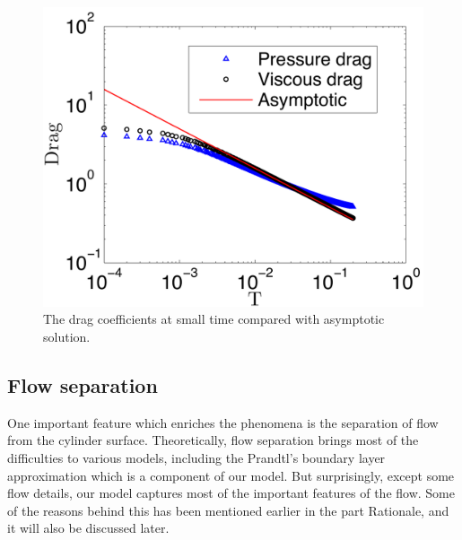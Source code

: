 \begin{figure}
\begin{center}
\includegraphics[width=12cm]{./Figures/results/static/InitialDrag.pdf}
\end{center}
 \caption[Initial drag coefficient]{The drag coefficients at small time compared with asymptotic solution.}
 \label{fig:InitialDrag}
\end{figure}


\subsection{Flow separation}

One important feature which enriches the phenomena is the separation of flow from the cylinder surface.
Theoretically, flow separation brings most of the difficulties to various models, including the Prandtl's boundary layer approximation which is a component of our model.
But surprisingly, except some flow details, our model captures most of the important features of the flow.
Some of the reasons behind this has been mentioned earlier in the part Rationale, and it will also be discussed later.

